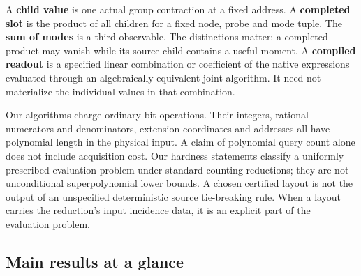 \documentclass[11pt,a4paper]{article}
\begin{document}
A \textbf{child value} is one actual group contraction at a fixed
address. A \textbf{completed slot} is the product of all children for a
fixed node, probe and mode tuple. The \textbf{sum of modes} is a third
observable. The distinctions matter: a completed product may vanish
while its source child contains a useful moment. A \textbf{compiled
readout} is a specified linear combination or coefficient of the native
expressions evaluated through an algebraically equivalent joint
algorithm. It need not materialize the individual values in that
combination.

Our algorithms charge ordinary bit operations. Their integers, rational
numerators and denominators, extension coordinates and addresses all
have polynomial length in the physical input. A claim of polynomial
query count alone does not include acquisition cost. Our hardness
statements classify a uniformly prescribed evaluation problem under
standard counting reductions; they are not unconditional superpolynomial
lower bounds. A chosen certified layout is not the output of an
unspecified deterministic source tie-breaking rule. When a layout
carries the reduction's input incidence data, it is an explicit part of
the evaluation problem.

\subsection{Main results at a glance}\label{v9-main-results-at-a-glance}
\end{document}

